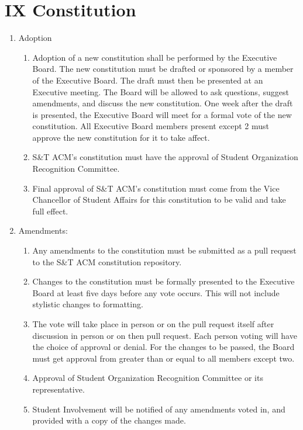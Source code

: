 
\section{IX \textendash{} Constitution}
\begin{enumerate}
  \item Adoption
    \begin{enumerate}
      \item Adoption of a new constitution shall be performed by the Executive
        Board. The new constitution must be drafted or sponsored by a member of
        the Executive Board. The draft must then be presented at an Executive
        meeting. The Board will be allowed to ask questions, suggest amendments,
        and discuss the new constitution. One week after the draft is presented,
        the Executive Board will meet for a formal vote of the new constitution.
        All Executive Board members present except 2 must approve the new
        constitution for it to take affect.
      \item	S\&T ACM’s constitution must have the approval of Student
        Organization Recognition Committee.
      \item	Final approval of S\&T ACM’s constitution must come from the Vice
        Chancellor of Student Affairs for this constitution to be valid and take
        full effect.
    \end{enumerate}
  \item	Amendments:
    \begin{enumerate}
      \item Any amendments to the constitution must be submitted as a pull
        request to the S\&T ACM constitution repository.
      \item Changes to the constitution must be formally presented to the
        Executive Board at least five days before any vote occurs. This will not
        include stylistic changes to formatting.
      \item The vote will take place in person or on the pull request itself
        after discussion in person or on then pull request. Each person voting
        will have the choice of approval or denial. For the changes to be
        passed, the Board must get approval from greater than or equal to all
        members except two.
      \item	Approval of Student Organization Recognition Committee or its
        representative.
      \item	Student Involvement will be notified of any amendments voted in, and
        provided with a copy of the changes made.
    \end{enumerate}


\end{enumerate}
